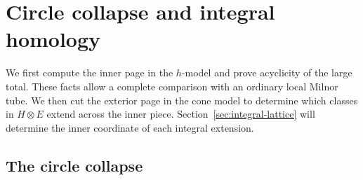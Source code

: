\section{Circle collapse and integral homology}\label{sec:circle-collapse}

We first compute the inner page in the \(h\)-model and prove acyclicity
of the large total. These facts allow a complete comparison with an
ordinary local Milnor tube. We then cut the exterior page in the cone
model to determine which classes in \(H\otimes E\) extend across
the inner piece. Section~\ref{sec:integral-lattice} will determine
the inner coordinate of each integral extension.

\subsection{The circle collapse}

